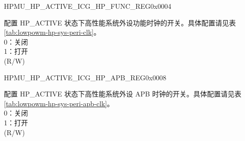 \begin{register}{H}{PMU\_HP\_ACTIVE\_ICG\_HP\_FUNC\_REG}{0x0004}\label{regdesc:PMUHPACTIVEICGHPFUNCREG}
%
\regnewline%
\begin{regdesc}\begin{reglist}
\label{fielddesc:PMUHPACTIVEDIGICGFUNCEN}\item [PMU\_HP\_ACTIVE\_DIG\_ICG\_FUNC\_EN] 配置 HP\_ACTIVE 状态下高性能系统外设功能时钟的开关。具体配置请见表 \ref{tab:lowpowm-hp-sys-peri-clk}。 \\
0：关闭\\
1：打开\\
(R/W)
\end{reglist}\end{regdesc}
\end{register}


\begin{register}{H}{PMU\_HP\_ACTIVE\_ICG\_HP\_APB\_REG}{0x0008}\label{regdesc:PMUHPACTIVEICGHPAPBREG}
%
\regnewline%
\begin{regdesc}\begin{reglist}
\label{fielddesc:PMUHPACTIVEDIGICGAPBEN}\item [PMU\_HP\_ACTIVE\_DIG\_ICG\_APB\_EN] 配置 HP\_ACTIVE 状态下高性能系统外设 APB 时钟的开关。具体配置请见表 \ref{tab:lowpowm-hp-sys-peri-apb-clk}。\\
0：关闭\\
1：打开\\
(R/W)
\end{reglist}\end{regdesc}
\end{register}




